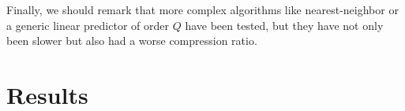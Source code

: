 Finally, we should remark that more complex algorithms like nearest-neighbor or a generic linear predictor of order $Q$ have been tested, but they have not only been slower but also had a worse compression ratio.

\section{Results}

